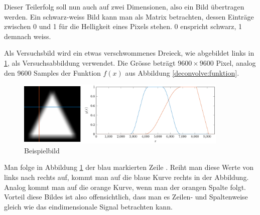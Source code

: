 Dieser Teilerfolg soll nun auch auf zwei Dimensionen, also ein Bild übertragen werden.
Ein schwarz-weiss Bild kann man als Matrix betrachten, dessen Einträge zwischen 0 und 1 für die Helligkeit eines Pixels stehen.
0 enspricht schwarz, 1 demnach weiss.

Als Versuchsbild wird ein etwas verschwommenes Dreieck, wie abgebildet links in \ref{deconvolve:example}, als Versuchsabbildung verwendet.
Die Grösse beträgt $9600\times9600$ Pixel, analog den 9600 Samples der Funktion $f(x)$ aus Abbildung \ref{deconvolve:funktion}.
\begin{figure}[h]
\centering
\includegraphics[width=0.9\textwidth]{./papers/deconvolve/pictures/dreieck.pdf}
\caption{Beispielbild\label{deconvolve:example}}
\end{figure}

Man folge in Abbildung \ref{deconvolve:example} der blau markierten \glqq Zeile \grqq{}.
Reiht man diese Werte von links nach rechts auf, kommt man auf die blaue Kurve rechts in der Abbildung.
Analog kommt man auf die orange Kurve, wenn man der orangen \glqq Spalte \grqq{} folgt.
Vorteil diese Bildes ist also offensichtlich, dass man es Zeilen- und Spaltenweise gleich wie das eindimensionale Signal betrachten kann.

